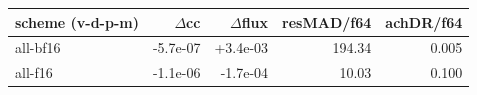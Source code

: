 \begin{tabular}{lrrrr}
\toprule
scheme (v-d-p-m) & $\Delta$cc & $\Delta$flux & resMAD/f64 & achDR/f64 \\
\midrule
all-bf16 & -5.7e-07 & +3.4e-03 & 194.34 & 0.005 \\
all-f16 & -1.1e-06 & -1.7e-04 & 10.03 & 0.100 \\
\bottomrule
\end{tabular}